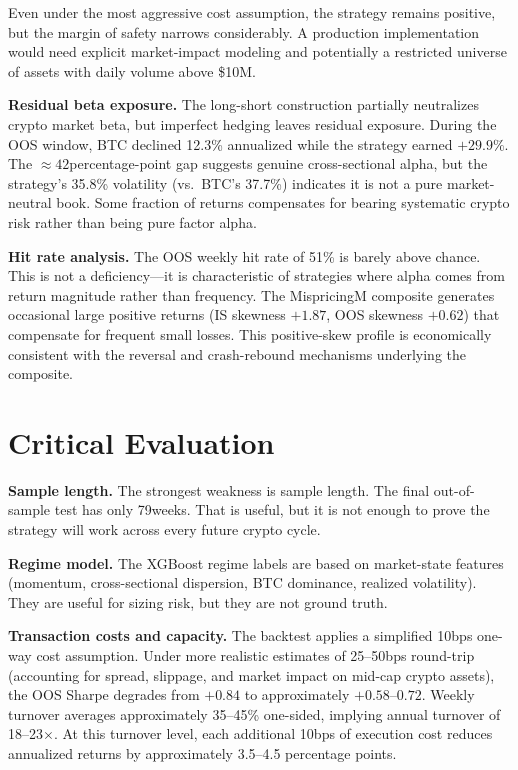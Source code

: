 \documentclass[11pt,a4paper]{article}
\begin{document}
Even under the most aggressive cost assumption, the strategy remains positive, but the margin of safety narrows considerably. A production implementation would need explicit market-impact modeling and potentially a restricted universe of assets with daily volume above \$10\;M.

\textbf{Residual beta exposure.}\;
The long-short construction partially neutralizes crypto market beta, but imperfect hedging leaves residual exposure. During the OOS window, BTC declined 12.3\% annualized while the strategy earned $+29.9\%$. The $\approx 42$\;percentage-point gap suggests genuine cross-sectional alpha, but the strategy's 35.8\% volatility (vs.\ BTC's 37.7\%) indicates it is not a pure market-neutral book. Some fraction of returns compensates for bearing systematic crypto risk rather than being pure factor alpha.

\textbf{Hit rate analysis.}\;
The OOS weekly hit rate of 51\% is barely above chance. This is not a deficiency---it is characteristic of strategies where alpha comes from return magnitude rather than frequency. The MispricingM composite generates occasional large positive returns (IS skewness $+1.87$, OOS skewness $+0.62$) that compensate for frequent small losses. This positive-skew profile is economically consistent with the reversal and crash-rebound mechanisms underlying the composite.

\section{Critical Evaluation}

\textbf{Sample length.}\;
The strongest weakness is sample length. The final out-of-sample test has only 79\;weeks. That is useful, but it is not enough to prove the strategy will work across every future crypto cycle.

\textbf{Regime model.}\;
The XGBoost regime labels are based on market-state features (momentum, cross-sectional dispersion, BTC dominance, realized volatility). They are useful for sizing risk, but they are not ground truth.

\textbf{Transaction costs and capacity.}\;
The backtest applies a simplified 10\;bps one-way cost assumption. Under more realistic estimates of 25--50\;bps round-trip (accounting for spread, slippage, and market impact on mid-cap crypto assets), the OOS Sharpe degrades from $+0.84$ to approximately $+0.58$--$0.72$. Weekly turnover averages approximately 35--45\% one-sided, implying annual turnover of 18--23$\times$. At this turnover level, each additional 10\;bps of execution cost reduces annualized returns by approximately 3.5--4.5 percentage points.
\end{document}

